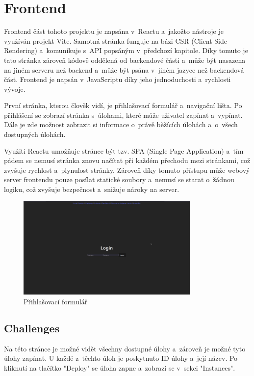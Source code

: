 \documentclass[12pt, a4paper,
oneside,      %
openright
]{report}
\begin{document}
\chapter{Frontend}
Frontend část tohoto projektu je napsána v~Reactu a~jakožto nástroje je využíván projekt Vite. Samotná stránka funguje na bázi CSR (Client Side Rendering) a~komunikuje s~API popsáným v~předchozí kapitole. Díky tomuto je tato stránka zároveň kódově oddělená od backendové části a~může být nasazena na jiném serveru než backend a~může být psána v~jiném jazyce než backendová část. Frontend je napsán v~JavaScriptu díky jeho jednoduchosti a~rychlosti vývoje.

První stránka, kterou člověk vidí, je přihlašovací formulář a~navigační lišta. Po přihlášení se zobrazí stránka s~úlohami, které může uživatel zapínat a~vypínat. Dále je zde možnost zobrazit si informace o~právě běžících úlohách a~o~všech dostupných úlohách.

Využití Reactu umožňuje stránce být tzv. SPA (Single Page Application) a~tím pádem se nemusí stránka znovu načítat při každém přechodu mezi stránkami, což zvyšuje rychlost a~plynulost stránky. Zároveň díky tomuto přístupu může webový server frontendu pouze posílat statické soubory a~nemusí se starat o~žádnou logiku, což zvyšuje bezpečnost a~snižuje nároky na server.

\begin{figure}[h]
	\centering
	\includegraphics[width=0.8\textwidth]{01-login_screen.png}
	\caption{Přihlašovací formulář}
	\label{fig:frontend-login}
\end{figure}

\section{Challenges}
Na této stránce je možné vidět všechny dostupné úlohy a~zároveň je možné tyto úlohy zapínat. U každé z~těchto úloh je poskytnuto ID úlohy a~její název. Po kliknutí na tlačítko "Deploy" se úloha zapne a~zobrazí se v~sekci "Instances".
\end{document}
